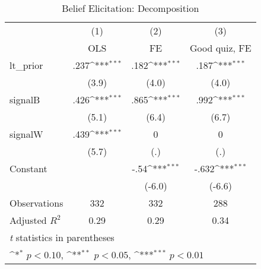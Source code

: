 \begin{table}[htbp]\centering
\def\sym#1{\ifmmode^{#1}\else\(^{#1}\)\fi}
\caption{Belief Elicitation: Decomposition}
\begin{tabular}{l*{3}{c}}
\hline\hline
                &\multicolumn{1}{c}{(1)}&\multicolumn{1}{c}{(2)}&\multicolumn{1}{c}{(3)}\\
                &\multicolumn{1}{c}{OLS}&\multicolumn{1}{c}{FE}&\multicolumn{1}{c}{Good quiz, FE}\\
\hline
lt\_prior        &     .237\sym{***}&     .182\sym{***}&     .187\sym{***}\\
                &    (3.9)         &    (4.0)         &    (4.0)         \\
signalB         &     .426\sym{***}&     .865\sym{***}&     .992\sym{***}\\
                &    (5.1)         &    (6.4)         &    (6.7)         \\
signalW         &     .439\sym{***}&        0         &        0         \\
                &    (5.7)         &      (.)         &      (.)         \\
Constant        &                  &     -.54\sym{***}&    -.632\sym{***}\\
                &                  &   (-6.0)         &   (-6.6)         \\
\hline
Observations    &      332         &      332         &      288         \\
Adjusted \(R^{2}\)&     0.29         &     0.29         &     0.34         \\
\hline\hline
\multicolumn{4}{l}{\footnotesize \textit{t} statistics in parentheses}\\
\multicolumn{4}{l}{\footnotesize \sym{*} \(p<0.10\), \sym{**} \(p<0.05\), \sym{***} \(p<0.01\)}\\
\end{tabular}
\end{table}
